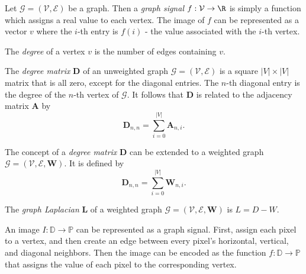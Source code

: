 \documentclass[12pt]{article}
\begin{document}
\begin{defn}
    Let $\mathcal{G} = (\mathcal{V}, \mathcal{E})$ be a graph. Then a \emph{graph signal} $f: \mathcal{V} \to \R$ is simply a function which assigns a real value to each vertex. The image of $f$ can be represented as a vector $v$ where the $i$-th entry is $f(i)$ - the value associated with the $i$-th vertex.
\end{defn}

\begin{defn}
    The \emph{degree} of a vertex $v$ is the number of edges containing $v$.
\end{defn}

\begin{defn}
    The \emph{degree matrix} $\bm{D}$ of an unweighted graph $\mathcal{G} = (\mathcal{V}, \mathcal{E})$ is a square $|V| \times |V|$ matrix that is all zero, except for the diagonal entries. The $n$-th diagonal entry is the degree of the $n$-th vertex of $\mathcal{G}$. It follows that $\bm{D}$ is related to the adjacency matrix $\bm{A}$ by \[\bm{D}_{n,n} = \sum_{i=0}^{|V|}\bm{A}_{n,i}.\]
\end{defn}

\begin{defn}
    The concept of a \emph{degree matrix} $\bm{D}$ can be extended to a weighted graph $\mathcal{G} = (\mathcal{V}, \mathcal{E}, \bm{W})$. It is defined by \[\bm{D}_{n,n} = \sum_{i=0}^{|V|}\bm{W}_{n,i}.\]
\end{defn}

\begin{defn}
    The \emph{graph Laplacian} $\bm{L}$ of a weighted graph $\mathcal{G} = (\mathcal{V}, \mathcal{E}, \bm{W})$ is $L = D - W$.
\end{defn}

An image $I: \mathbb{D} \to \mathbb{P}$ can be represented as a graph signal. First, assign each pixel to a vertex, and then create an edge between every pixel's horizontal, vertical, and diagonal neighbors. Then the image can be encoded as the function $f: \mathbb{D} \to \mathbb{P}$ that assigns the value of each pixel to the corresponding vertex.
\end{document}
